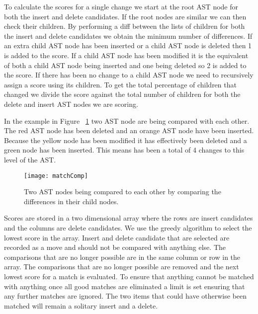 To calculate the scores for a single change we start at the root AST node for both the insert and delete candidates.  
If the root nodes are similar we can then check their children. 
By performing a diff between the lists of children for both the insert and delete candidates we obtain the minimum number of differences.  
If an extra child AST node has been inserted or a child AST node is deleted then 1 is added to the score. 
If a child AST node has been modified it is the equivalent of both a child AST node being inserted and one being deleted so 2 is added to the score. 
If there has been no change to a child AST node we need to recursively assign a score using its children. 
To get the total percentage of children that changed we divide the score against the total number of children for both the delete and insert AST nodes we are scoring.

In the example in Figure ~\ref{fig:matchComp} two AST node are being compared with each other. The red AST node has been deleted and an orange AST node have been inserted. Because the yellow node has been modified it has effectively been deleted and a green node has been inserted. This means has been a total of 4 changes to this level of the AST. 

\begin{figure}[!t]
 \begin{center}
 \texttt{[image: matchComp]}
 \end{center}
 \caption{Two AST nodes being compared to each other by comparing the differences in their child nodes.}
 \label{fig:matchComp}
\end{figure}

Scores are stored in a two dimensional array where the rows are insert candidates and the columns are delete candidates.  We use the greedy algorithm to select the lowest score in the array.  Insert and delete candidate that are selected are recorded as a move and should not be compared with anything else. The comparisons that are no longer possible are in the same column or row in the array.  The comparisons that are no longer possible are removed and the next lowest score for a match is evaluated.  To ensure that anything cannot be matched with anything once all good matches are eliminated a limit is set ensuring that any further matches are ignored.  The two items that could have otherwise been matched will remain a solitary insert and a delete.


